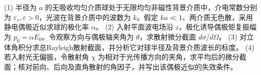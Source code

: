 (1) 半径为 \(a\) 的无吸收均匀介质球处于无限均匀非磁性背景介质中，介电常数分别为 \(\varepsilon_s,\varepsilon>0\)，光波在背景介质中的波数为 \(k\)。假定 \(ka\ll1\)、两介质无色散，采用静电偶极近似求球的极化率 \(\alpha\)。
(2) 入射平面波电场沿 \(z\)，极化诱导偶极矩复振幅为 \(p_0=\alpha E_0\)。令观察方向与偶极轴夹角为 \(\theta\)，求散射微分截面 \(d\sigma/d\Omega\)。
(3) 对立体角积分求总Rayleigh散射截面，并分析它对球半径及背景介质波长的标度。
(4) 若入射光无偏振，令散射角 \(\chi\) 为相对于光传播方向的夹角，求平均后的微分截面；核对前向、后向及直角散射的角因子，并写出该偶极近似的失效条件。
